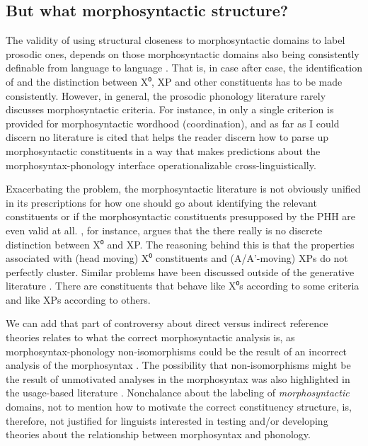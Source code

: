 \documentclass[output=paper,hidelinks]{langscibook}
\begin{document}
\subsection{But what morphosyntactic structure?}
\label{sec:whatmorphosyntax}

The validity of using structural closeness to morphosyntactic domains to label prosodic ones, depends on those morphosyntactic domains also being consistently definable from language to language \citep{miller2018phonology}. That is, in case after case, the identification of and the distinction between X⁰, XP and other constituents has to be made consistently. However, in general, the prosodic phonology literature rarely discusses morphosyntactic criteria. For instance, in \citet{fery2017intonation} only a single criterion is provided for morphosyntactic wordhood (coordination), and as far as I could discern no literature is cited that helps the reader discern how to parse up morphosyntactic constituents in a way that makes predictions about the morphosyntax-phonology interface operationalizable cross-linguistically. 

Exacerbating the problem, the morphosyntactic literature is not obviously unified in its prescriptions for how one should go about identifying the relevant constituents or if the morphosyntactic constituents presupposed by the PHH are even valid at all. \citet{carnie2000definition}, for instance, argues that the there really is no discrete distinction between X⁰ and XP. The reasoning behind this is that the properties associated with (head moving) X⁰ constituents  and (A/A'-moving) XPs do not perfectly cluster. Similar problems have been discussed outside of the generative literature \citep{russell1999whats, haspelmathword:2011, Bickel2017, tallman2021constituency}. There are constituents that behave like X⁰s according to some criteria and like XPs according to others. 

We can add that part of controversy about direct versus indirect reference theories relates to what the correct morphosyntactic analysis is, as morphosyntax-phonology non-isomorphisms could be the result of an incorrect analysis of the morphosyntax \citep{seidl2001minimal}. The possibility that non-isomorphisms might be the result of unmotivated analyses in the morphosyntax was also highlighted in the usage-based literature \citep{bybee1999effect}. Nonchalance about the labeling of \textit{morphosyntactic} domains, not to mention how to motivate the correct constituency structure, is, therefore, not justified for linguists interested in testing and/or developing theories about the relationship between morphosyntax and phonology.
\end{document}
